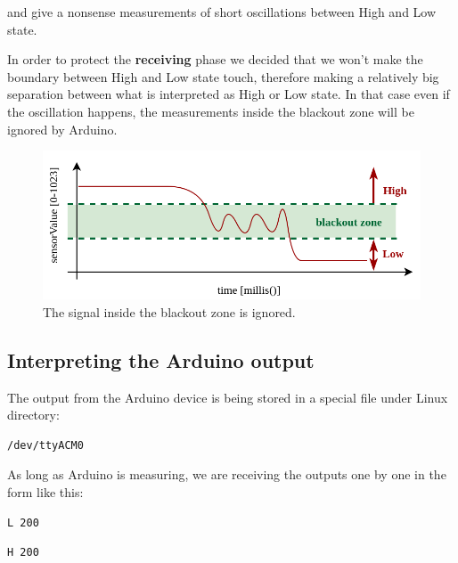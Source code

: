\documentclass[10pt]{report}
\begin{document}
and give a nonsense measurements of short oscillations between High and Low state.

In order to protect the \textbf{receiving} phase we decided that we won't make the boundary between High and Low state touch, therefore making a relatively big separation between what is interpreted as High or Low state. In that case even if the oscillation happens, the measurements inside the blackout zone will be ignored by Arduino.

\begin{figure}[H]
\centering\includegraphics[width=14.5cm]{blackoutZoneIgnored.png}
\caption{The signal inside the blackout zone is ignored.}				
\label{fig:blackoutzoneignored}
\end{figure}

\subsection{Interpreting the Arduino output}

The output from the Arduino device is being stored in a special file under Linux directory:

\begin{snugshade}
\begin{verbatim}
/dev/ttyACM0
\end{verbatim}
\end{snugshade}

As long as Arduino is measuring, we are receiving the outputs one by one in the form like this:

\begin{snugshade}
\begin{verbatim}
L 200
\end{verbatim}
\end{snugshade}

\begin{snugshade}
\begin{verbatim}
H 200
\end{verbatim}
\end{snugshade}
\end{document}
